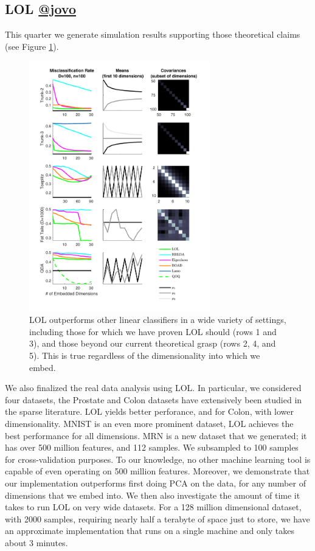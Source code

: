 \documentclass[simplex.tex]{subfiles}
\begin{document}
\subsection[LOL]{LOL \href{https://github.com/jovo}{@jovo}}

This quarter we generate simulation results supporting those theoretical claims (see Figure \ref{fig:LOL}).


\begin{figure}[h!]
\begin{cframed}
\centering
\includegraphics[width=0.7\textwidth]{../../figs/plot_all.pdf}
\caption{
LOL outperforms other linear classifiers in a wide variety of settings, including those for which we have proven LOL should (rows 1 and 3), and those beyond our current theoretical grasp (rows 2, 4, and 5). This is true regardless of the dimensionality into which we embed.
}
\label{fig:LOL}
\end{cframed}
\end{figure}

\clearpage

We also finalized the real data analysis using LOL.  In particular, we considered four datasets, the Prostate and Colon datasets have extensively been studied in the sparse literature.  LOL yields better perforance, and for Colon, with lower dimensionality.  MNIST is an even more prominent dataset, LOL achieves the best performance for all dimensions.  MRN is a new dataset that we generated; it has over 500 million features, and 112 samples.  We subsampled to 100 samples for cross-validation purposes.  To our knowledge, no other machine learning tool is capable of even operating on 500 million features.  Moreover, we demonstrate that our implementation outperforms first doing PCA on the data, for any number of dimensions that we embed into.  We then also investigate the amount of time it takes to run LOL on very wide datasets.  For a 128 million dimensional dataset, with 2000 samples, requiring nearly half a terabyte of space just to store, we have an approximate implementation that runs on a single machine and only takes about 3 minutes.
\end{document}
